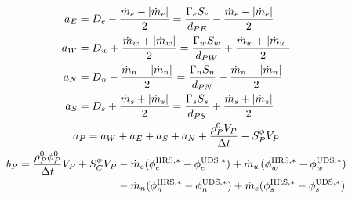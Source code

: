 \begin{gather}
	\begin{align}
		a_E &= D_e - \frac{\dot{m}_e - \abs{\dot{m}_e}}{2} = 
		\frac{\Gamma_e S_e}{d_{PE}} - \frac{\dot{m}_e - \abs{\dot{m}_e}}{2} \\
		a_W &= D_w + \frac{\dot{m}_w + \abs{\dot{m}_w}}{2} =
		\frac{\Gamma_w S_w}{d_{PW}} + \frac{\dot{m}_w + \abs{\dot{m}_w}}{2} \\
		a_N &= D_n - \frac{\dot{m}_n - \abs{\dot{m}_n}}{2} =
		\frac{\Gamma_n S_n}{d_{PN}} - \frac{\dot{m}_n - \abs{\dot{m}_n}}{2} \\
		a_S &= D_s + \frac{\dot{m}_s + \abs{\dot{m}_s}}{2} = 
		\frac{\Gamma_s S_s}{d_{PS}} + \frac{\dot{m}_s + \abs{\dot{m}_s}}{2}
	\end{align} \\
	a_P = a_W + a_E + a_S + a_N + \frac{\rho_P^0 V_P}{\Delta t} - S_P^\phi V_P \\
	\begin{align}
		b_P = \frac{\rho_P^0 \phi_P^0}{\Delta t} V_P + S_C^\phi V_P 
		&- \dot{m}_e (\phi_e^{\text{HRS},\ast} - \phi_e^{\text{UDS},\ast}) 
		+ \dot{m}_w (\phi_w^{\text{HRS},\ast} - \phi_w^{\text{UDS},\ast}) \nonumber \\
		&- \dot{m}_n (\phi_n^{\text{HRS},\ast} - \phi_n^{\text{UDS},\ast}) 
		+ \dot{m}_s (\phi_s^{\text{HRS},\ast} - \phi_s^{\text{UDS},\ast})
	\end{align}
\end{gather}





